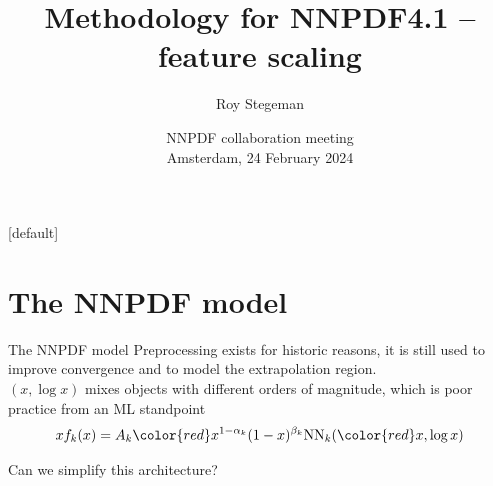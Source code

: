 \documentclass[aspectratio=169, 8pt,t]{beamer}
\title{Methodology for NNPDF4.1 -- feature scaling}
\date{NNPDF collaboration meeting  \\[0.1cm] Amsterdam, 24 February 2024}
\author{Roy Stegeman}
\institute{\small The University of Edinburgh}
\begin{document}
{
\begin{frame}
  \titlepage
\end{frame}
}

[default]



\newcommand{\nn}{\vspace*{1em}}

\section*{The NNPDF model}

\begin{frame}{The NNPDF model}
  Preprocessing exists for historic reasons, it is still used to improve convergence and to model the extrapolation region. \\ \nn
  $(x,\log x)$ mixes objects with different orders of magnitude, which is poor practice from an ML standpoint \\ \nn
  $$ xf_k(x) = A_k {\color{red} x^{1-\alpha_k}(1-x)^{\beta_k}} \mathrm{NN}_k({\color{red} x,\log x}) $$

  \vspace*{0.5cm}
  \centering Can we simplify this architecture?
\end{frame}
\end{document}
